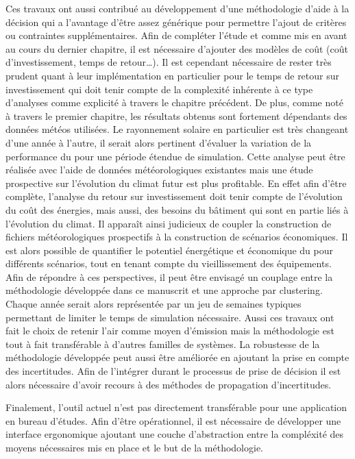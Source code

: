 Ces travaux ont aussi contribué au développement d’une méthodologie d’aide à la décision
qui a l’avantage d’être assez générique pour permettre l’ajout de critères ou contraintes
supplémentaires. Afin de compléter l’étude et comme mis en avant au cours du dernier
chapitre, il est nécessaire d’ajouter des modèles de coût (coût d’investissement, temps de
retour\dots). Il est cependant nécessaire de rester très prudent quant à leur
implémentation en particulier pour le temps de retour sur investissement qui doit tenir
compte de la complexité inhérente à ce type d’analyses comme explicité à travers le
chapitre précédent. De plus, comme noté à travers le premier chapitre, les résultats
obtenus sont fortement dépendants des données météos utilisées. Le rayonnement solaire en
particulier est très changeant d’une année à l’autre, il serait alors pertinent d’évaluer
la variation de la performance du  pour une période étendue de simulation. Cette
analyse peut être réalisée avec l’aide de données météorologiques existantes mais une
étude prospective sur l’évolution du climat futur est plus profitable. En effet afin
d’être complète, l’analyse du retour sur investissement doit tenir compte de l’évolution
du coût des énergies, mais aussi, des besoins du bâtiment qui sont en partie liés à
l’évolution du climat. Il apparaît ainsi judicieux de coupler la construction de fichiers
météorologiques prospectifs à la construction de scénarios économiques. Il est alors
possible de quantifier le potentiel énergétique et économique du  pour différents
scénarios, tout en tenant compte du vieillissement des équipements. Afin de répondre à ces
perspectives, il peut être envisagé un couplage entre la méthodologie développée dans ce
manuscrit et une approche par clustering. Chaque année serait alors représentée par un jeu
de semaines typiques permettant de limiter le temps de simulation nécessaire. Aussi ces
travaux ont fait le choix de retenir l’air comme moyen d’émission mais la méthodologie est
tout à fait transférable à d’autres familles de systèmes. La robustesse de la méthodologie
développée peut aussi être améliorée en ajoutant la prise en compte des incertitudes. Afin
de l’intégrer durant le processus de prise de décision il est alors nécessaire d’avoir
recours à des méthodes de propagation d’incertitudes.

Finalement, l’outil actuel n’est pas directement transférable pour une application en
bureau d’études. Afin d’être opérationnel, il est nécessaire de développer une interface
ergonomique ajoutant une couche d’abstraction entre la compléxité des moyens nécessaires
mis en place et le but de la méthodologie.


